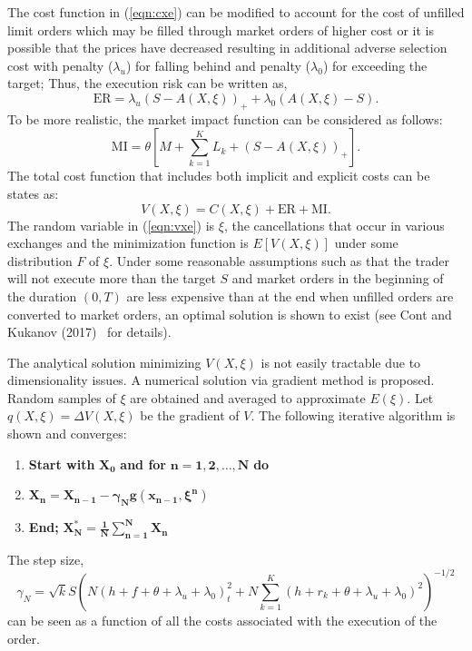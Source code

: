 The cost function in (\ref{eqn:cxe}) can be modified to account for the cost of unfilled limit orders which may be filled through market orders of higher cost or it is possible that the prices have decreased resulting in additional adverse selection cost with penalty ($\lambda_u$) for falling behind and penalty ($\lambda_0$) for exceeding the target; Thus, the execution risk can be written as,
	\begin{equation}\label{eqn:er}
	\text{ER}= \lambda_u (S-A(X,\xi))_+ + \lambda_0 (A(X,\xi)-S).
	\end{equation}
To be more realistic, the market impact function can be considered as follows:
	\begin{equation}\label{eqn:mi}
	\text{MI}= \theta \left[ M + \sum_{k=1}^K L_k + (S-A(X,\xi))_+ \right].
	\end{equation}
The total cost function that includes both implicit and explicit costs can be states as:
	\begin{equation}\label{eqn:vxe}
	V(X,\xi)= C(X,\xi) + \text{ER} + \text{MI}.
	\end{equation}
The random variable in (\ref{eqn:vxe}) is $\xi$, the cancellations that occur in various exchanges and the minimization function is $E[V(X,\xi)]$ under some distribution $F$ of $\xi$. Under some reasonable assumptions such as that the trader will not execute more than the target $S$ and market orders in the beginning of the duration $(0,T)$ are less expensive than at the end when unfilled orders are converted to market orders, an optimal solution is shown to exist (see Cont and Kukanov (2017)~\cite{contk} for details).


The analytical solution minimizing $V(X,\xi)$ is not easily tractable due to dimensionality issues. A numerical solution via gradient method is proposed. Random samples of $\xi$ are obtained and averaged to approximate $E(\xi)$. Let $q(X,\xi)= \Delta V(X,\xi)$ be the gradient of $V$. The following iterative algorithm is shown and converges:
	\begin{enumerate}[--]
	\item \textbf{Start with }$\mathbf{X_0}$\textbf{ and for }$\mathbf{n=1,2,\ldots,N}$\textbf{ do}
	\item $\mathbf{X_n=X_{n-1} - \gamma_N g(x_{n-1}, \xi^n)}$
	\item \textbf{End; }$\mathbf{X_N^* = \frac{1}{N} \sum_{n=1}^N X_n}$
	\end{enumerate}
The step size, \small
	\begin{equation}\label{eqn:7gammaN}
	 \gamma_N = \sqrt{k} S \left( N(h+f+\theta+\lambda_u +\lambda_0)^2 _ t + N \sum_{k=1}^K (h+r_k+\theta+\lambda_u+\lambda_0)^2 \right)^{-1/2} 
	\end{equation}
\normalsize can be seen as a function of all the costs associated with the execution of the order.

